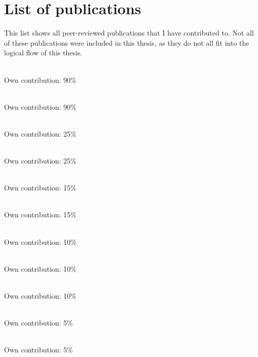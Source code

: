 \chapter{List of publications}


\label{chp:Publicationlist}


This list shows all peer-reviewed publications that I have contributed to. Not all of these publications were included in this thesis, as they do not all fit into the logical flow of this thesis.\\

\noindent{}\\ \strut \hfill Own contribution: 90\%\\

\noindent{}\\ \strut \hfill Own contribution: 90\%\\

\noindent{}\\ \strut \hfill Own contribution: 25\%\\

\noindent{} \\ \strut \hfill Own contribution: 25\%\\

\noindent{}\\ \strut \hfill Own contribution: 15\%\\

\noindent{}\\ \strut \hfill Own contribution: 15\%\\

\noindent{}\\ \strut \hfill Own contribution: 10\%\\

\noindent{}\\ \strut \hfill Own contribution: 10\%\\

\noindent{}\\ \strut \hfill Own contribution: 10\%\\

\noindent{}\\ \strut \hfill Own contribution: 5\%\\

\noindent{}\\  \strut \hfill  Own contribution: 5\%\\


